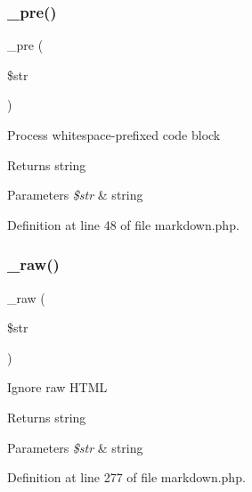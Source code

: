 \hypertarget{class_markdown_a2f41e07d6b78f3e9b882bcb34792446d}{}\label{class_markdown_a2f41e07d6b78f3e9b882bcb34792446d} 
\subsubsection{\texorpdfstring{\+\_\+pre()}{\_pre()}}
{\footnotesize\ttfamily \+\_\+pre (\begin{DoxyParamCaption}\item[{}]{\$str }\end{DoxyParamCaption})\hspace{0.3cm}{\ttfamily [protected]}}

Process whitespace-\/prefixed code block \begin{DoxyReturn}{Returns}
string 
\end{DoxyReturn}

\begin{DoxyParams}{Parameters}
{\em \$str} & string \\
\hline
\end{DoxyParams}


Definition at line 48 of file markdown.\+php.

\hypertarget{class_markdown_aa1fa1fb7287331de41bc0c75fa349afa}{}\label{class_markdown_aa1fa1fb7287331de41bc0c75fa349afa} 
\subsubsection{\texorpdfstring{\+\_\+raw()}{\_raw()}}
{\footnotesize\ttfamily \+\_\+raw (\begin{DoxyParamCaption}\item[{}]{\$str }\end{DoxyParamCaption})\hspace{0.3cm}{\ttfamily [protected]}}

Ignore raw H\+T\+ML \begin{DoxyReturn}{Returns}
string 
\end{DoxyReturn}

\begin{DoxyParams}{Parameters}
{\em \$str} & string \\
\hline
\end{DoxyParams}


Definition at line 277 of file markdown.\+php.

